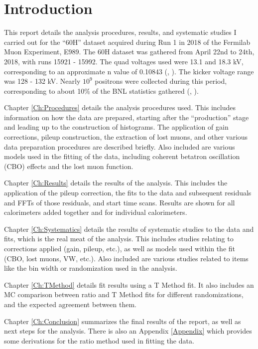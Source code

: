 
\chapter{Introduction}
\label{Ch:Introduction}

This report details the analysis procedures, results, and systematic studies I carried out for the ``60H'' dataset acquired during Run 1 in 2018 of the Fermilab Muon \gmtwo Experiment, E989. The 60H dataset was gathered from April 22nd to 24th, 2018, with runs 15921 - 15992. The quad voltages used were 13.1 and 18.3 kV, corresponding to an approximate n value of 0.10843 (, \cite{Tunes}). The kicker voltage range was 128 - 132 kV. Nearly $10^{9}$ positrons were collected during this period, corresponding to about 10\% of the BNL statistics gathered (, \cite{HertzogAfterDenver}).

Chapter \ref{Ch:Procedures} details the analysis procedures used. This includes information on how the data are prepared, starting after the ``production'' stage and leading up to the construction of histograms. The application of gain corrections, pileup construction, the extraction of lost muons, and other various data preparation procedures are described briefly. Also included are various models used in the fitting of the data, including coherent betatron oscillation (CBO) effects and the lost muon function.

Chapter \ref{Ch:Results} details the results of the analysis. This includes the application of the pileup correction, the fits to the data and subsequent residuals and FFTs of those residuals, and start time scans. Results are shown for all calorimeters added together and for individual calorimeters.

Chapter \ref{Ch:Systematics} details the results of systematic studies to the data and fits, which is the real meat of the analysis. This includes studies relating to corrections applied (gain, pileup, etc.), as well as models used within the fit (CBO, lost muons, VW, etc.). Also included are various studies related to items like the bin width or randomization used in the analysis.

Chapter \ref{Ch:TMethod} details fit results using a T Method fit. It also includes an MC comparison between ratio and T Method fits for different randomizations, and the expected agreement between them.

Chapter \ref{Ch:Conclusion} summarizes the final results of the report, as well as next steps for the analysis. There is also an Appendix \ref{Appendix} which provides some derivations for the ratio method used in fitting the data.
